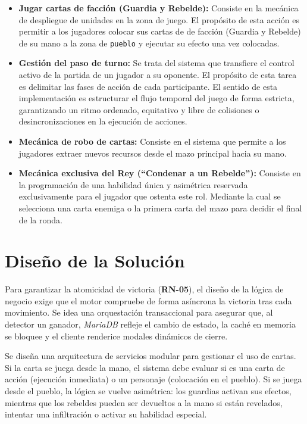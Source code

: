 \begin{itemize}
    \item \textbf{Jugar cartas de facción (Guardia y Rebelde):} Consiste en la mecánica de despliegue de unidades en la zona de juego. El propósito de esta acción es permitir a los jugadores colocar sus cartas de de facción (Guardia y Rebelde) de su mano a la zona de \texttt{pueblo} y ejecutar su efecto una vez colocadas.
    \item \textbf{Gestión del paso de turno:} Se trata del sistema que transfiere el control activo de la partida de un jugador a su oponente. El propósito de esta tarea es delimitar las fases de acción de cada participante. El sentido de esta implementación es estructurar el flujo temporal del juego de forma estricta, garantizando un ritmo ordenado, equitativo y libre de colisiones o desincronizaciones en la ejecución de acciones.
    \item \textbf{Mecánica de robo de cartas:} Consiste en el sistema que permite a los jugadores extraer nuevos recursos desde el mazo principal hacia su mano.
    \item \textbf{Mecánica exclusiva del Rey (``Condenar a un Rebelde''):} Consiste en la programación de una habilidad única y asimétrica reservada exclusivamente para el jugador que ostenta este rol. Mediante la cual se selecciona una carta enemiga o la primera carta del mazo para decidir el final de la ronda.
\end{itemize}

\section{Diseño de la Solución}
Para garantizar la atomicidad de victoria (\textbf{RN-05}), el diseño de la lógica de negocio exige que el motor compruebe de forma asíncrona la victoria tras cada movimiento. Se idea una orquestación transaccional para asegurar que, al detector un ganador, \textit{MariaDB} refleje el cambio de estado, la caché en memoria se bloquee y el cliente renderice modales dinámicos de cierre.

Se diseña una arquitectura de servicios modular para gestionar el uso de cartas. Si la carta se juega desde la mano, el sistema debe evaluar si es una carta de acción (ejecución inmediata) o un personaje (colocación en el pueblo). Si se juega desde el pueblo, la lógica se vuelve asimétrica: los guardias activan sus efectos, mientras que los rebeldes pueden ser devueltos a la mano si están revelados, intentar una infiltración o activar su habilidad especial.

